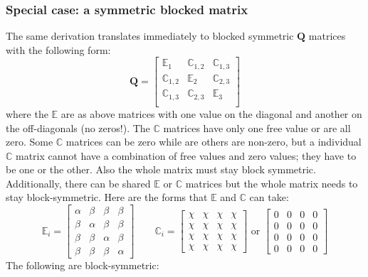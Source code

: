 \documentclass[]{article}
\def\QQ{\mbox{$\mathbf Q$}}	 \def\qq{\mbox{$\mathbf q$}}
\begin{document}
\subsubsection{Special case: a symmetric blocked matrix}
\label{sec:Q.symmetric blocked}
The same derivation translates immediately to blocked symmetric $\QQ$ matrices with the following form:
\begin{equation*}
\QQ=
\begin{bmatrix}
\mathbb{E}_1&\mathbb{C}_{1,2}&\mathbb{C}_{1,3}\\
\mathbb{C}_{1,2}&\mathbb{E}_2&\mathbb{C}_{2,3}\\
\mathbb{C}_{1,3}&\mathbb{C}_{2,3}&\mathbb{E}_3\\
\end{bmatrix}
\end{equation*}
where the $\mathbb{E}$ are as above matrices with one value on the diagonal and another on the off-diagonals (no zeros!). The $\mathbb{C}$ matrices have only one free value or are all zero.  Some $\mathbb{C}$ matrices can be zero while are others are non-zero, but a individual $\mathbb{C}$ matrix cannot have a combination of free values and zero values; they have to be one or the other. Also the whole matrix must stay block symmetric. Additionally, there can be shared $\mathbb{E}$ or $\mathbb{C}$ matrices but the whole matrix needs to stay block-symmetric.  Here are the forms that $\mathbb{E}$ and $\mathbb{C}$ can take:
\begin{equation*}
\mathbb{E}_i=
\begin{bmatrix}
\alpha&\beta&\beta&\beta\\
\beta&\alpha&\beta&\beta\\
\beta&\beta&\alpha&\beta\\
\beta&\beta&\beta&\alpha
\end{bmatrix}
\quad\quad
\mathbb{C}_i=
\begin{bmatrix}
\chi&\chi&\chi&\chi\\
\chi&\chi&\chi&\chi\\
\chi&\chi&\chi&\chi\\
\chi&\chi&\chi&\chi
\end{bmatrix}
\text{ or }
\begin{bmatrix}
0&0&0&0\\
0&0&0&0\\
0&0&0&0\\
0&0&0&0
\end{bmatrix}
\end{equation*}
The following are block-symmetric:
\end{document}
